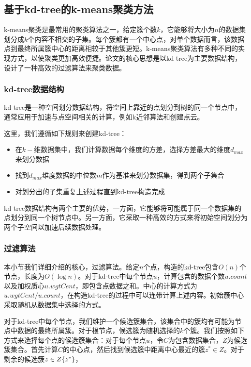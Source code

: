 \subsection{基于kd-tree的k-means聚类方法}
k-means聚类是最常用的聚类算法之一，给定簇个数$ k $，它能够将大小为$ n $的数据集划分成$ k $个内容不相交的子集。每个簇都有一个中心点，对单个数据而言，该数据点到最终所属簇中心的距离相较于其他簇更短。k-means聚类算法有多种不同的实现方式，以使聚类更加高效便捷。\cite{kanungo2002efficient}论文的核心思想是以kd-tree为主要数据结构，设计了一种高效的过滤算法来聚类数据。

\subsubsection{kd-tree数据结构}
kd-tree是一种空间划分数据结构，将空间上靠近的点划分到树的同一个节点中\cite{el2020kd}，通常应用于加速与点空间相关的计算，例如k近邻算法和创建点云。

这里，我们遵循如下规则来创建kd-tree：
\begin{itemize}
	\item 在$ k- $维数据集中，我们计算数据每个维度的方差，选择方差最大的维度$ d_{max} $来划分数据
	\item 找到$ d_{max} $维度数据的中位数$ m $作为基准来划分数据集，得到两个子集合
	\item 对划分出的子集重复上述过程直到kd-tree构造完成
\end{itemize}

kd-tree数据结构有两个主要的优势，一方面，它能够将可能属于同一个数据集的点划分到同一个树节点中。另一方面，它采取一种高效的方式来将初始空间划分为两个子空间以加速后续数据处理。

\subsubsection{过滤算法}
本小节我们详细介绍\cite{kanungo2002efficient}的核心，过滤算法。给定$ n $个点，构造的kd-tree包含$ O(n) $个节点，长度为$ O(\log n) $。对于kd-tree中每个节点$ u $，计算包含的数据个数$ u.count $以及加权质心$ u.wgtCent $，即包含点数据之和。中心的计算方式为$ u.wgtCent/u.count $，在构造kd-tree的过程中可以连带计算上述内容。初始簇中心采取随机从数据集中选择的方式。

对于kd-tree中每个节点，我们维护一个候选簇集合，该集合中的簇均有可能为节点中数据的最终所属簇。对于根节点，候选簇为随机选择的$ k $个簇。我们按照如下方式来选择每个点的候选簇集合：对于每个节点$ u $，令$ C $为包含数据集合，$ Z $为候选簇集合。首先计算$ C $的中心点，然后找到候选簇中距离中心最近的簇$ z^*\in Z $。对于剩余的候选簇$ z\in Z\\ \{z^*\} $，
